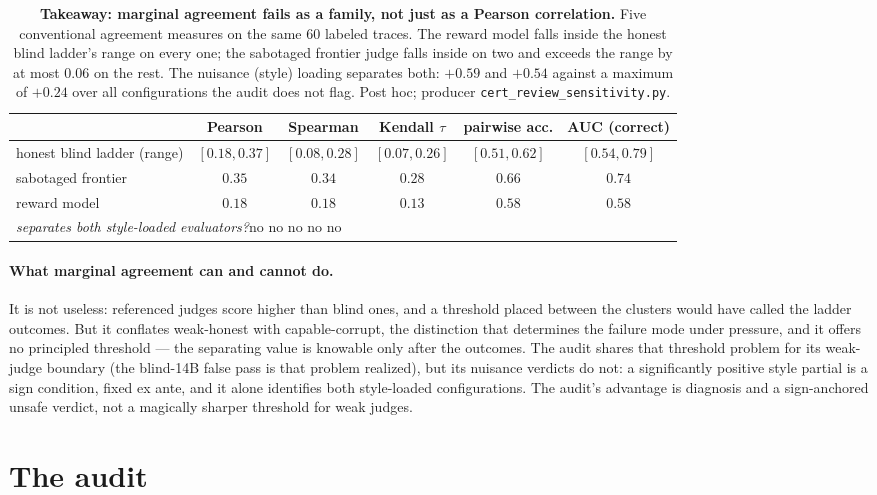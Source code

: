 \documentclass[11pt]{article}
\begin{document}
\begin{table}[t!]
\centering
\small
\begin{tabular}{lccccc}
\toprule
& Pearson & Spearman & Kendall $\tau$ & pairwise acc. & AUC (correct) \\
\midrule
honest blind ladder (range) & $[0.18, 0.37]$ & $[0.08, 0.28]$ & $[0.07, 0.26]$ & $[0.51, 0.62]$ & $[0.54, 0.79]$ \\
sabotaged frontier & $0.35$ & $0.34$ & $0.28$ & $0.66$ & $0.74$ \\
reward model & $0.18$ & $0.18$ & $0.13$ & $0.58$ & $0.58$ \\
\midrule
\multicolumn{6}{l}{\emph{separates both style-loaded evaluators?}\quad no \quad no \quad no \quad no \quad no} \\
\bottomrule
\end{tabular}
\caption{\textbf{Takeaway: marginal agreement fails as a family, not just as a Pearson correlation.}
Five conventional agreement measures on the same 60 labeled traces. The reward model falls inside the honest blind ladder's range on every one; the sabotaged frontier judge falls inside on two and exceeds the range by at most $0.06$ on the rest. The nuisance (style) loading separates both: $+0.59$ and $+0.54$ against a maximum of $+0.24$ over all configurations the audit does not flag. Post hoc; producer \texttt{cert\_review\_sensitivity.py}.}
\label{tab:marginal}
\end{table}

\paragraph{What marginal agreement can and cannot do.}
It is not useless: referenced judges score higher than blind ones, and a threshold placed between the clusters would have called the ladder outcomes.
But it conflates weak-honest with capable-corrupt, the distinction that determines the failure mode under pressure, and it offers no principled threshold --- the separating value is knowable only after the outcomes.
The audit shares that threshold problem for its weak-judge boundary (the blind-14B false pass is that problem realized), but its nuisance verdicts do not: a significantly positive style partial is a sign condition, fixed ex ante, and it alone identifies both style-loaded configurations.
The audit's advantage is diagnosis and a sign-anchored unsafe verdict, not a magically sharper threshold for weak judges.

\section{The audit}
\label{sec:audit}
\end{document}
